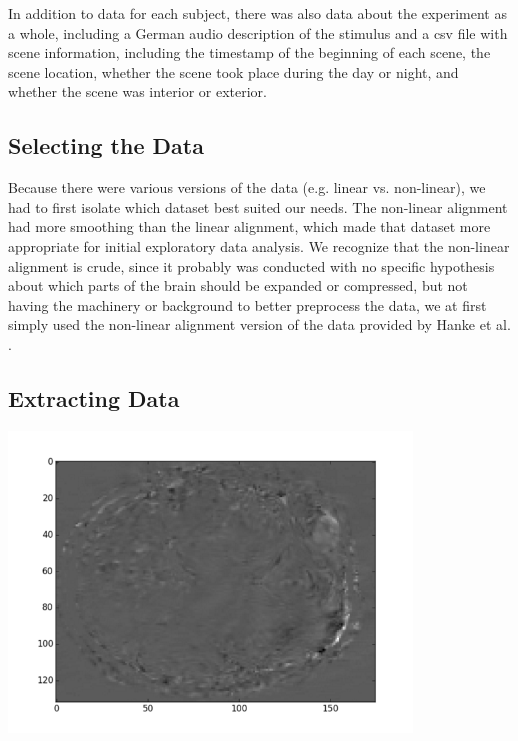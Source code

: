 \documentclass[11pt]{article}
\begin{document}
In addition to data for each subject, there was also data about the
experiment as a whole, including a German audio description of the stimulus
and a csv file with scene information, including the timestamp of the
beginning of each scene, the scene location, whether the scene took place
during the day or night, and whether the scene was interior or exterior.  

\subsection{Selecting the Data}
Because there were various versions of the
data (e.g. linear vs. non-linear), we had to first isolate which dataset best
suited our needs. The non-linear alignment had more smoothing than the linear
alignment, which made that dataset more appropriate for initial exploratory
data analysis.  We recognize that the non-linear alignment is crude, since it
probably was conducted with no specific hypothesis about which parts of the
brain should be expanded or compressed, but not having the machinery or
background to better preprocess the data, we at first simply used the non-linear
alignment version of the data provided by Hanke et al.
\cite{hank2014audiomovie}.

\subsection{Extracting Data} 
\begin{center}                                                                  
\includegraphics[height=8cm]{1}                                                 
\end{center}                                                                    
                                                                                
\end{document}
